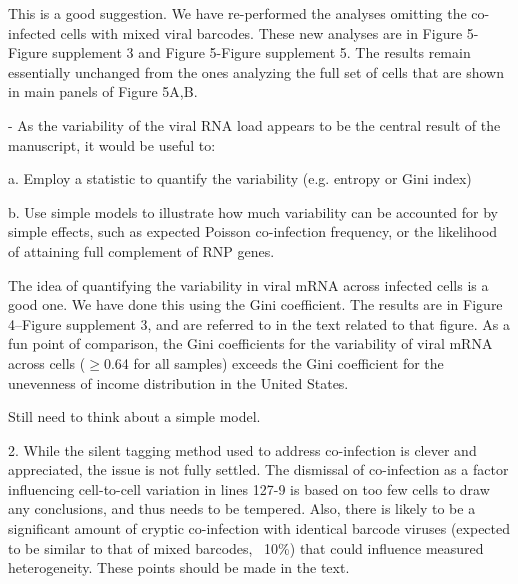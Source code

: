 \documentclass[11pt, oneside]{article}   	%
\begin{document}
{\color{black}
This is a good suggestion.
We have re-performed the analyses omitting the co-infected cells with mixed viral barcodes.
These new analyses are in Figure 5-Figure supplement 3 and Figure 5-Figure supplement 5.
The results remain essentially unchanged from the ones analyzing the full set of cells that are shown in main panels of Figure 5A,B.
}

- As the variability of the viral RNA load appears to be the central result of the manuscript, it would be useful to: 

    a. Employ a statistic to quantify the variability (e.g. entropy or Gini index) 

    b. Use simple models to illustrate how much variability can be accounted for by simple effects, such as expected Poisson co-infection frequency, or the likelihood of attaining full complement of RNP genes. 

{\color{black}
The idea of quantifying the variability in viral mRNA across infected cells is a good one.
We have done this using the Gini coefficient.
The results are in Figure 4--Figure supplement 3, and are referred to in the text related to that figure.
As a fun point of comparison, the Gini coefficients for the variability of viral mRNA across cells ($\ge$0.64 for all samples) exceeds the Gini coefficient for the unevenness of income distribution in the United States.
}
    
{\color{red}
Still need to think about a simple model.
}


2. While the silent tagging method used to address co-infection is clever and appreciated, the issue is not fully settled. The dismissal of co-infection as a factor influencing cell-to-cell variation in lines 127-9 is based on too few cells to draw any conclusions, and thus needs to be tempered. Also, there is likely to be a significant amount of cryptic co-infection with identical barcode viruses (expected to be similar to that of mixed barcodes, ~10\%) that could influence measured heterogeneity. These points should be made in the text. 
\end{document}
